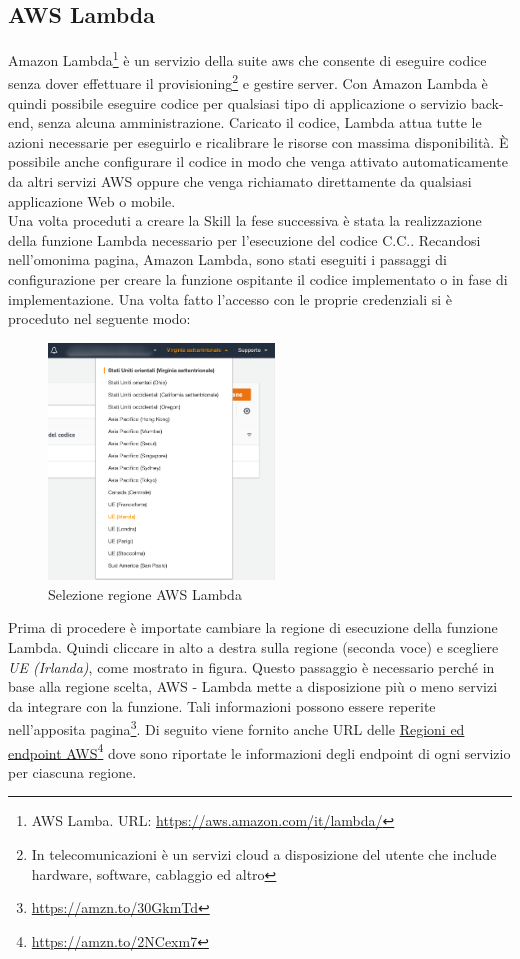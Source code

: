\subsection{AWS Lambda}
Amazon Lambda\footnote{AWS Lamba. URL: \href{https://aws.amazon.com/it/lambda/}{https://aws.amazon.com/it/lambda/}} è un servizio della suite aws che consente di eseguire codice senza dover effettuare il provisioning\footnote{In telecomunicazioni è un servizi cloud a disposizione del utente che include hardware, software, cablaggio ed altro} e gestire server. Con Amazon Lambda è quindi possibile eseguire codice per qualsiasi tipo di applicazione o servizio back-end, senza alcuna amministrazione. Caricato il codice, Lambda attua tutte le azioni necessarie per eseguirlo e ricalibrare le risorse con massima disponibilità. È possibile anche configurare il codice in modo che venga attivato automaticamente da altri servizi AWS oppure che venga richiamato direttamente da qualsiasi applicazione Web o mobile.\\[0.5cm]
Una volta proceduti a creare la Skill la fese successiva è stata la realizzazione della funzione Lambda necessario per l'esecuzione del codice C.C.. Recandosi nell'omonima pagina, Amazon Lambda, sono stati eseguiti i passaggi di configurazione per creare la funzione ospitante il codice implementato o in fase di implementazione. Una volta fatto l'accesso con le proprie credenziali si è proceduto nel seguente modo:
\begin{minipage}{0.5\textwidth}
	\begin{figure}[H]
		\includegraphics[width=6cm]{immagini/aws-lambda.png}
		\caption{\label{fig:aws_lambda_regione}Selezione regione AWS Lambda}
	\end{figure}
\end{minipage}
\begin{minipage}{0.5\textwidth}
	Prima di procedere è importate cambiare la regione di esecuzione della funzione Lambda. Quindi cliccare in alto a destra sulla regione (seconda voce) e scegliere \textit{UE (Irlanda)}, come mostrato in figura. Questo passaggio è necessario perché in base alla regione scelta, AWS - Lambda mette a disposizione più o meno servizi da integrare con la funzione. Tali informazioni possono essere reperite nell'apposita pagina\footnote{\href{https://amzn.to/30GkmTd}{https://amzn.to/30GkmTd}}. Di seguito viene fornito anche URL delle \href{https://amzn.to/2NCexm7}{Regioni ed endpoint AWS}\footnote{\href{https://amzn.to/2NCexm7}{https://amzn.to/2NCexm7}} dove sono riportate le informazioni degli endpoint di ogni servizio per ciascuna regione.
\end{minipage}
